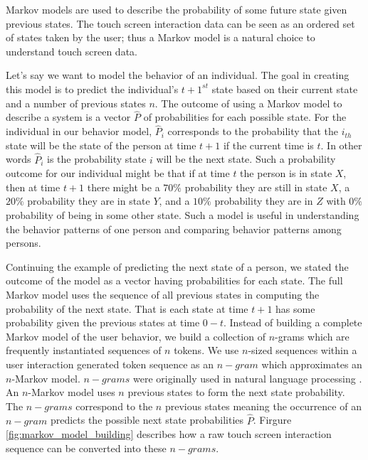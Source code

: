 Markov models are used to describe
the probability of some future state given previous states.
The touch screen interaction data can be seen as
an ordered set of states taken by the user;
thus a Markov model 
is a natural choice
to understand touch screen data.

Let's say we want to model the behavior of an individual.
The goal in creating
this model is to predict the individual's $t+1^{st}$ state
based on their current state and
a number of previous states $n$.
%
The outcome of using a Markov model to describe a system
is a vector $\hat{P}$ of probabilities for each possible state.
For the individual in our behavior model,
$\hat{P}_i$ corresponds to the probability that the $i_{th}$ state
will be the state of the person at time $t+1$ 
if the current time is $t$.
%
In other words $\hat{P}_i$ is 
the probability state $i$ will be the next state.
%
Such a probability outcome for our individual might be
that if at time $t$ the person is in state $X$,
then at time $t+1$ there might be 
a $70\%$ probability they are still in state $X$,
a $20\%$ probability they are in state $Y$, and
a $10\%$ probability they are in $Z$ with
$0\%$ probability of being in some other state.
%
Such a model is useful in understanding 
the behavior patterns of one person and
comparing behavior patterns among persons.

Continuing the example of predicting
the next state of a person,
we stated the outcome of the model as a vector
having probabilities for each state.
The full Markov model uses the sequence of all previous states
in computing the probability of the next state.
%
That is each state at time $t+1$ 
has some probability 
given the previous states at time $0-t$.
%
Instead of building a complete Markov model of the user behavior,
we build a collection of $n$-grams
which are frequently instantiated sequences of $n$ tokens.
We use $n$-sized sequences 
within a user interaction
generated token sequence as an
$n-gram$ which approximates an $n$-Markov model.
$n-grams$ were originally
used in natural language processing \cite{Brown:ngram}.
%
An $n$-Markov model uses $n$ previous states
to form the next state probability.
The $n-grams$ correspond to the $n$ previous states
meaning the occurrence of an $n-gram$ predicts 
the possible next state probabilities $\hat{P}$.
%
Firgure \ref{fig:markov_model_building} describes
how a raw touch screen interaction sequence can be
converted into these $n-grams$.

